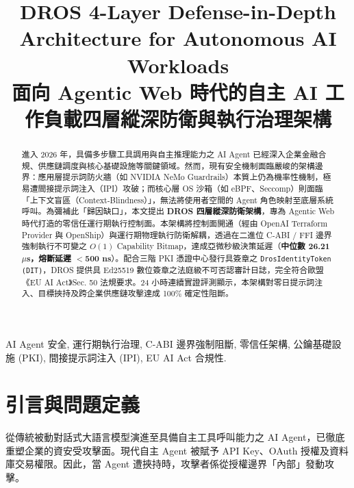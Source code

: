 \documentclass[conference]{IEEEtran}
\begin{document}
\title{DROS 4-Layer Defense-in-Depth Architecture for Autonomous AI Workloads\\
{\footnotesize \textnormal{面向 Agentic Web 時代的自主 AI 工作負載四層縱深防衛與執行治理架構}}
}

\author{
}

\maketitle
\thispagestyle{plain}
\pagestyle{plain}

\begin{abstract}
進入 2026 年，具備多步驟工具調用與自主推理能力之 AI Agent 已經深入企業金融合規、供應鏈調度與核心基礎設施等關鍵領域。然而，現有安全機制面臨嚴峻的架構邊界：應用層提示詞防火牆（如 NVIDIA NeMo Guardrails）本質上仍為機率性機制，極易遭間接提示詞注入（IPI）攻破；而核心層 OS 沙箱（如 eBPF、Seccomp）則面臨「上下文盲區（Context-Blindness）」，無法將使用者空間的 Agent 角色映射至底層系統呼叫。為彌補此「歸因缺口」，本文提出 \textbf{DROS 四層縱深防衛架構}，專為 Agentic Web 時代打造的零信任運行期執行控制面。本架構將控制面開通（經由 OpenAI Terraform Provider 與 OpenShip）與運行期物理執行防衛解耦，透過在二進位 C-ABI / FFI 邊界強制執行不可變之 $O(1)$ Capability Bitmap，達成亞微秒級決策延遲（\textbf{中位數 26.21 $\mu$s，熔斷延遲 $<$500 ns}）。配合三階 PKI 憑證中心發行具簽章之 \texttt{DrosIdentityToken (DIT)}，DROS 提供具 Ed25519 數位簽章之法庭級不可否認審計日誌，完全符合歐盟《EU AI Act》Sec. 50 法規要求。24 小時連續實證評測顯示，本架構對零日提示詞注入、目標挾持及跨企業供應鏈攻擊達成 100\% 確定性阻斷。
\end{abstract}

\begin{IEEEkeywords}
AI Agent 安全, 運行期執行治理, C-ABI 邊界強制阻斷, 零信任架構, 公鑰基礎設施 (PKI), 間接提示詞注入 (IPI), EU AI Act 合規性.
\end{IEEEkeywords}

\section{引言與問題定義}
從傳統被動對話式大語言模型演進至具備自主工具呼叫能力之 AI Agent，已徹底重塑企業的資安受攻擊面。現代自主 Agent 被賦予 API Key、OAuth 授權及資料庫交易權限。因此，當 Agent 遭挾持時，攻擊者係從授權邊界「內部」發動攻擊。
\end{document}
